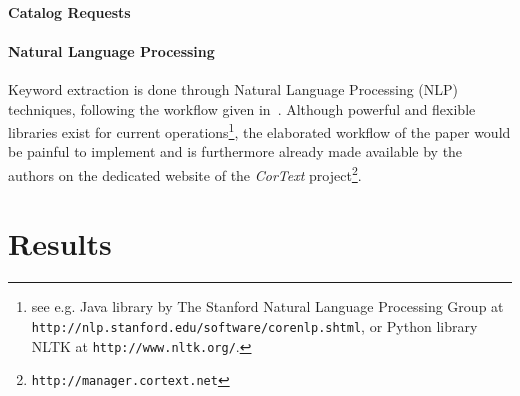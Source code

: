 \paragraph{Catalog Requests}

\cite{mendeley}


\paragraph{Natural Language Processing}
Keyword extraction is done through Natural Language Processing (NLP) techniques, following the workflow given in~\cite{chavalarias2013phylomemetic}. Although powerful and flexible libraries exist for current operations\footnote{see e.g. Java library by The Stanford Natural Language Processing Group at \texttt{http://nlp.stanford.edu/software/corenlp.shtml}, or Python library NLTK at \texttt{http://www.nltk.org/}.}, the elaborated workflow of the paper would be painful to implement and is furthermore already made available by the authors on the dedicated website of the \emph{CorText} project\footnote{\texttt{http://manager.cortext.net}}.

\section{Results}

















